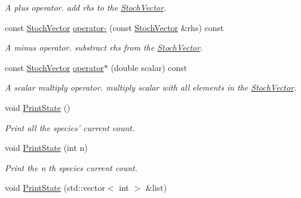 \begin{CompactItemize}
\begin{CompactList}\small\item\em A plus operator. add rhs to the \hyperlink{class_stoch_vector}{StochVector}. \item\end{CompactList}\item 
\hypertarget{class_stoch_vector_a4c12889be76c4a97c63ec035462c21f}{
const \hyperlink{class_stoch_vector}{StochVector} \hyperlink{class_stoch_vector_a4c12889be76c4a97c63ec035462c21f}{operator-} (const \hyperlink{class_stoch_vector}{StochVector} \&rhs) const }
\label{class_stoch_vector_a4c12889be76c4a97c63ec035462c21f}

\begin{CompactList}\small\item\em A minus operator. substract rhs from the \hyperlink{class_stoch_vector}{StochVector}. \item\end{CompactList}\item 
\hypertarget{class_stoch_vector_0acbef6781e1f54082723a573aa2dab5}{
const \hyperlink{class_stoch_vector}{StochVector} \hyperlink{class_stoch_vector_0acbef6781e1f54082723a573aa2dab5}{operator$\ast$} (double scalar) const }
\label{class_stoch_vector_0acbef6781e1f54082723a573aa2dab5}

\begin{CompactList}\small\item\em A scalar multiply operator. multiply scalar with all elements in the \hyperlink{class_stoch_vector}{StochVector}. \item\end{CompactList}\item 
\hypertarget{class_stoch_vector_a1f4dc7f1e1108193259e174359eca6c}{
void \hyperlink{class_stoch_vector_a1f4dc7f1e1108193259e174359eca6c}{PrintState} ()}
\label{class_stoch_vector_a1f4dc7f1e1108193259e174359eca6c}

\begin{CompactList}\small\item\em Print all the species' current count. \item\end{CompactList}\item 
\hypertarget{class_stoch_vector_e43448b674ff322901da3a89a06199ce}{
void \hyperlink{class_stoch_vector_e43448b674ff322901da3a89a06199ce}{PrintState} (int n)}
\label{class_stoch_vector_e43448b674ff322901da3a89a06199ce}

\begin{CompactList}\small\item\em Print the n th species current count. \item\end{CompactList}\item 
\hypertarget{class_stoch_vector_06d89eac52b93ed66eb9c5779639e96a}{
void \hyperlink{class_stoch_vector_06d89eac52b93ed66eb9c5779639e96a}{PrintState} (std::vector$<$ int $>$ \&list)}
\label{class_stoch_vector_06d89eac52b93ed66eb9c5779639e96a}


\end{CompactItemize}

